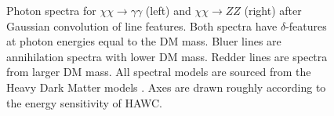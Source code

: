 \begin{figure}[h]
    \caption{Photon spectra for $\chi\chi \rightarrow \gamma\gamma$ (left) and $\chi\chi \rightarrow ZZ$ (right) after Gaussian convolution of line features. Both spectra have $\delta$-features at photon energies equal to the DM mass. Bluer lines are annihilation spectra with lower DM mass. Redder lines are spectra from larger DM mass. All spectral models are sourced from the Heavy Dark Matter models \cite{HDMSpectra}. Axes are drawn roughly according to the energy sensitivity of HAWC.}
    \label{fig:hdm_gamma_lines}
\end{figure}

